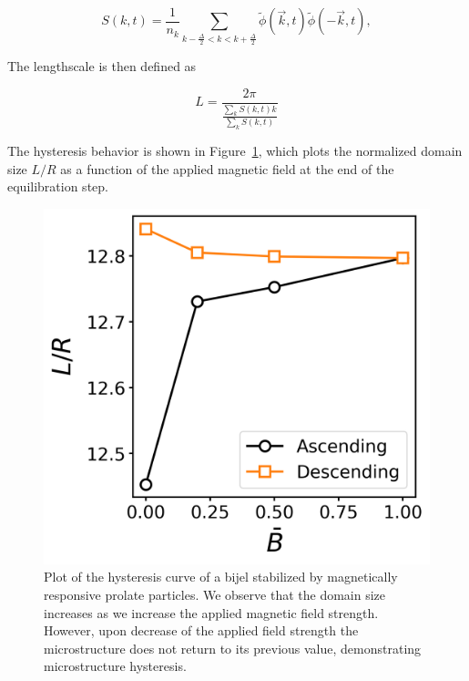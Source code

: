 %
\begin{equation}
S(k,t) = \frac{1}{n_k} \sum_{k-\frac{\Delta}{2}<k<k+\frac{\Delta}{2}} \tilde{\phi}(\vec{k},t)\tilde{\phi}(-\vec{k},t) ,
\end{equation}

The lengthscale is then defined as

\begin{equation}
    L = \frac{2 \pi}{\frac{ \sum_k S(k, t)k }{\sum_k S(k, t)}}
\end{equation}

The hysteresis behavior is shown in Figure~\ref{fig:hysteresis_curve}, which plots the normalized domain size \(L/R\) as a function of the applied magnetic 
field at the end of the equilibration step.

\begin{figure} 
    \centering 
    \includegraphics[scale=0.5]{../figures/results/paper2/hysteresis_curve.png} 
    \caption{Plot of the hysteresis curve of a bijel stabilized by magnetically responsive prolate particles. We observe that the domain size increases as we 
    increase the applied magnetic field strength. However, upon decrease of the applied field strength the microstructure does not return to its previous value,
    demonstrating microstructure hysteresis.} 
    \label{fig:hysteresis_curve} 
\end{figure}

